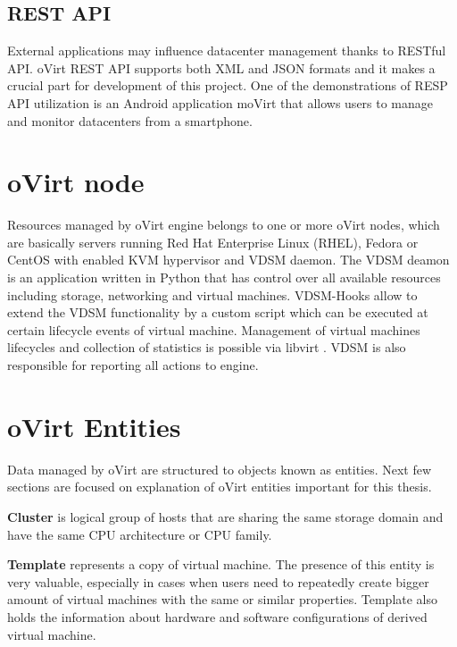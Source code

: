 \newpage
\subsection{REST API}
External applications may influence datacenter management thanks to RESTful API. oVirt REST API supports both XML and JSON formats and it makes a crucial part for development of this project. One of the demonstrations of RESP API utilization is an Android application moVirt that allows users to manage and monitor datacenters from a smartphone.

\section{oVirt node}
Resources managed by oVirt engine belongs to one or more oVirt nodes, which are basically servers running Red Hat Enterprise Linux (RHEL), Fedora or CentOS with enabled KVM \cite{kvm} hypervisor and VDSM daemon. The VDSM deamon is an application written in Python that has control over all available resources including storage, networking and virtual machines. VDSM-Hooks \cite{hooks} allow to extend the VDSM functionality by a custom script which can be executed at certain lifecycle events of virtual machine. Management of virtual machines lifecycles and collection of statistics is possible via libvirt \cite{libvirt}. VDSM is also responsible for reporting all actions to engine.

\newpage
\section{oVirt Entities}
Data managed by oVirt are structured to objects known as entities. Next few sections are focused on explanation of oVirt entities important for this thesis.

\textbf{Cluster} is logical group of hosts that are sharing the same storage domain and have the same CPU architecture or CPU family.

\textbf{Template} represents a copy of virtual machine. The presence of this entity is very valuable, especially in cases when users need to repeatedly create bigger amount of virtual machines with the same or similar properties. Template also holds the information about hardware and software configurations of derived virtual machine. 

